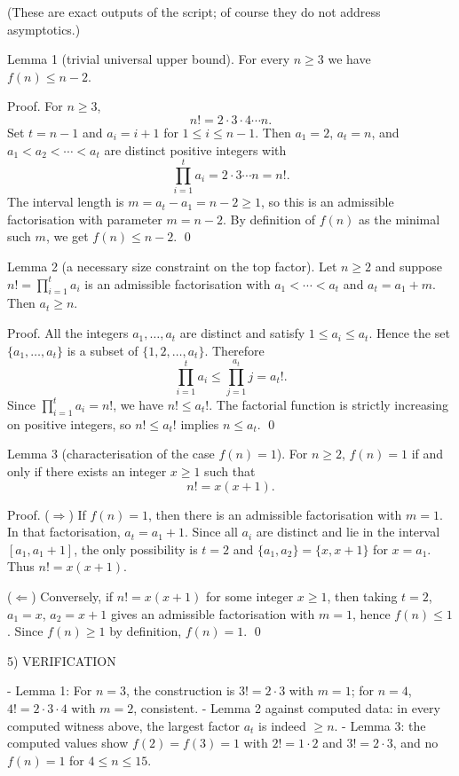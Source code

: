 (These are exact outputs of the script; of course they do not address asymptotics.)

Lemma 1 (trivial universal upper bound).
For every $n\ge 3$ we have $f(n)\le n-2$.

Proof.
For $n\ge 3$,
\[
 n! = 2\cdot 3\cdot 4\cdots n.
\]
Set $t=n-1$ and $a_i=i+1$ for $1\le i\le n-1$. Then $a_1=2$, $a_t=n$, and $a_1<a_2<\cdots<a_t$ are distinct positive integers with
\[
\prod_{i=1}^{t} a_i = 2\cdot 3\cdots n = n!.
\]
The interval length is $m=a_t-a_1=n-2\ge 1$, so this is an admissible factorisation with parameter $m=n-2$. By definition of $f(n)$ as the minimal such $m$, we get $f(n)\le n-2$. \qed

Lemma 2 (a necessary size constraint on the top factor).
Let $n\ge 2$ and suppose $n!=\prod_{i=1}^t a_i$ is an admissible factorisation with $a_1<\cdots<a_t$ and $a_t=a_1+m$. Then $a_t\ge n$.

Proof.
All the integers $a_1,\dots,a_t$ are distinct and satisfy $1\le a_i\le a_t$. Hence the set $\{a_1,\dots,a_t\}$ is a subset of $\{1,2,\dots,a_t\}$.
Therefore
\[
\prod_{i=1}^t a_i \le \prod_{j=1}^{a_t} j = a_t!.
\]
Since $\prod_{i=1}^t a_i = n!$, we have $n!\le a_t!$.
The factorial function is strictly increasing on positive integers, so $n!\le a_t!$ implies $n\le a_t$. \qed

Lemma 3 (characterisation of the case $f(n)=1$).
For $n\ge 2$, $f(n)=1$ if and only if there exists an integer $x\ge 1$ such that
\[
 n! = x(x+1).
\]

Proof.
($\Rightarrow$) If $f(n)=1$, then there is an admissible factorisation with $m=1$. In that factorisation, $a_t=a_1+1$. Since all $a_i$ are distinct and lie in the interval $[a_1,a_1+1]$, the only possibility is $t=2$ and $\{a_1,a_2\}=\{x,x+1\}$ for $x=a_1$. Thus $n!=x(x+1)$.

($\Leftarrow$) Conversely, if $n!=x(x+1)$ for some integer $x\ge 1$, then taking $t=2$, $a_1=x$, $a_2=x+1$ gives an admissible factorisation with $m=1$, hence $f(n)\le 1$. Since $f(n)\ge 1$ by definition, $f(n)=1$. \qed

5) VERIFICATION

- Lemma 1: For $n=3$, the construction is $3!=2\cdot 3$ with $m=1$; for $n=4$, $4!=2\cdot 3\cdot 4$ with $m=2$, consistent.
- Lemma 2 against computed data: in every computed witness above, the largest factor $a_t$ is indeed $\ge n$.
- Lemma 3: the computed values show $f(2)=f(3)=1$ with $2!=1\cdot 2$ and $3!=2\cdot 3$, and no $f(n)=1$ for $4\le n\le 15$.

